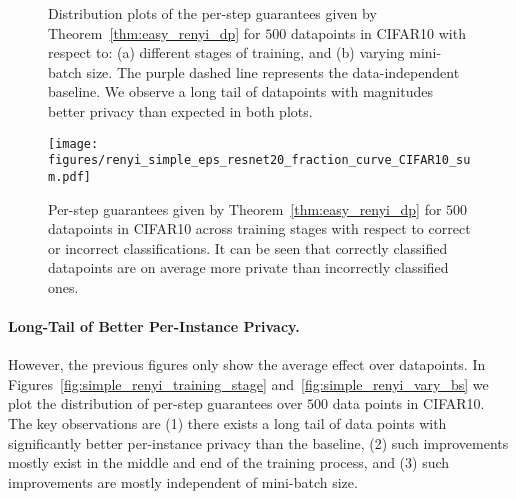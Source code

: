 \begin{figure}[!t]

\centering
{}

\caption{Distribution plots of the per-step guarantees given by Theorem~\ref{thm:easy_renyi_dp} for $500$ datapoints in CIFAR10 with respect to: (a) different stages of training, and (b) varying mini-batch size. The purple dashed line 
represents the data-independent baseline. We observe a long tail of datapoints with magnitudes better privacy than expected in both plots.
}
\label{fig:simple_renyi}
\end{figure}

\begin{figure}[!t]
\centering
\texttt{[image: figures/renyi\_simple\_eps\_resnet20\_fraction\_curve\_CIFAR10\_sum.pdf]}
\caption{Per-step guarantees given by Theorem~\ref{thm:easy_renyi_dp} for $500$ datapoints in CIFAR10 across training stages with respect to correct or incorrect classifications. It can be seen that correctly classified datapoints are on average more private than incorrectly classified ones.}
\label{fig:correct_incorrect}
\end{figure}



\paragraph{Long-Tail of Better Per-Instance Privacy.} However, the previous figures only show the average effect over datapoints. In Figures~\ref{fig:simple_renyi_training_stage} and~\ref{fig:simple_renyi_vary_bs} we plot the distribution of per-step guarantees over $500$ data points in CIFAR10. The key observations are (1) there exists a long tail of data points with significantly better per-instance privacy than the baseline,  (2) such improvements mostly exist in the middle and end of the training process, and (3) such improvements are mostly independent of mini-batch size.










